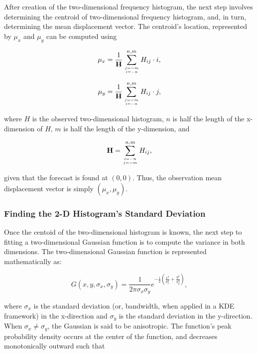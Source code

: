 After creation of the two-dimensional frequency histogram, the next step involves determining the centroid of two-dimensional frequency histogram, and, in turn, determining the mean displacement vector. The centroid's location, represented by $\mu_x$ and $\mu_y$ can be computed using

    \begin{equation}
        \label{mux}
        \mu_x = \frac{1}{\mathbf{H}} \sum\limits_{j=-m \atop i=-n}^{n,m}H_{ij} \cdot i,
    \end{equation}

    \begin{equation}
        \label{muy}
        \mu_y = \frac{1}{\mathbf{H}} \sum\limits_{j=-m \atop i=-n}^{n,m}H_{ij} \cdot j,
    \end{equation}

\noindent where $H$ is the observed two-dimensional histogram, $n$ is half the length of the x-dimension of $H$, $m$ is half the length of the y-dimension, and

    \begin{equation}
        \mathbf{H} = \sum\limits_{i=-n \atop j=-m}^{n,m} H_{ij},
    \end{equation}

\noindent given that the forecast is found at $(0, 0)$. Thus, the observation mean displacement vector is simply $(\mu_x, \mu_y)$.




\subsubsection{Finding the 2-D Histogram's Standard Deviation}
\label{std}

Once the centoid of the two-dimensional histogram is known, the next step to fitting a two-dimensional Gaussian function is to compute the variance in both dimensions. The two-dimensional Gaussian function is represented mathematically as:

    \begin{equation}
        \label{2DGauss}
        G(x, y, \sigma_x, \sigma_y) = \frac{1}{2 \pi \sigma_x \sigma_y} e^{- \frac{1}{2} \left( \frac{x^2}{\sigma_x^2} + \frac{y^2}{\sigma_y^2} \right)},
    \end{equation}

\noindent where $\sigma_x$ is the standard deviation (or, bandwidth, when applied in a KDE framework) in the x-direction and $\sigma_y$ is the standard deviation in the y-direction. When $\sigma_x \neq \sigma_y$, the Gaussian is said to be anisotropic. The function's peak probability density occurs at the center of the function, and decreases monotonically outward such that

